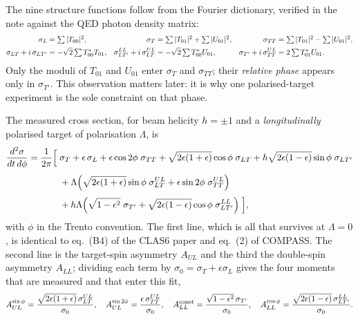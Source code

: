 \documentclass[11pt,a4paper]{article}
\newcommand{\sig}[1]{\sigma_{#1}}
\begin{document}
The nine structure functions follow from the Fourier dictionary, verified in
the note against the QED photon density matrix:
\begin{align}
\sig{L} &= \textstyle\sum |T_{00}|^2, &
\sig{T} &= \textstyle\sum |T_{01}|^2 + \sum |U_{01}|^2, &
\sig{TT} &= \textstyle\sum |T_{01}|^2 - \sum |U_{01}|^2,\notag\\
\sig{LT} + i\,\sig{LT'} &= -\sqrt2 \textstyle\sum T_{00}^{*} T_{01}, &
\sig{LT'}^{LL} + i\,\sig{LT}^{UL} &= -\sqrt2 \textstyle\sum T_{00}^{*} U_{01}, &
\sig{T'} + i\,\sig{TT}^{UL} &= 2 \textstyle\sum T_{01}^{*} U_{01}.
\label{eq:gram}
\end{align}
Only the moduli of $T_{01}$ and $U_{01}$ enter $\sig{T}$ and $\sig{TT}$; their
\emph{relative phase} appears only in $\sig{T'}$.  This observation matters
later: it is why one polarised-target experiment is the sole constraint on that
phase.

The measured cross section, for beam helicity $h = \pm 1$ and a
\emph{longitudinally} polarised target of polarisation $\Lambda$, is
\begin{align}
\frac{d^2\sigma}{dt\,d\phi} = \frac{1}{2\pi}\Big[\;
& \sig{T} + \epsilon\,\sig{L}
+ \epsilon\cos 2\phi\; \sig{TT}
+ \sqrt{2\epsilon(1+\epsilon)}\cos\phi\; \sig{LT}
+ h\sqrt{2\epsilon(1-\epsilon)}\sin\phi\; \sig{LT'}
\notag\\[1mm]
& + \Lambda\Big(\sqrt{2\epsilon(1+\epsilon)}\sin\phi\; \sig{LT}^{UL}
              + \epsilon\sin 2\phi\; \sig{TT}^{UL}\Big)
\notag\\[1mm]
& + h\Lambda\Big(\sqrt{1-\epsilon^2}\; \sig{T'}
               + \sqrt{2\epsilon(1-\epsilon)}\cos\phi\; \sig{LT'}^{LL}\Big)
\;\Big],
\label{eq:phidecomp}
\end{align}
with $\phi$ in the Trento convention.  The first line, which is all that
survives at $\Lambda = 0$, is identical to eq.~(B4) of the CLAS6 paper and
eq.~(2) of COMPASS.  The second line is the target-spin asymmetry $A_{UL}$ and
the third the double-spin asymmetry $A_{LL}$; dividing each term by
$\sigma_0 = \sig{T} + \epsilon\sig{L}$ gives the four moments that are measured
and that enter this fit,
\begin{equation}
A_{UL}^{\sin\phi} = \frac{\sqrt{2\epsilon(1+\epsilon)}\,\sig{LT}^{UL}}{\sigma_0},
\quad
A_{UL}^{\sin 2\phi} = \frac{\epsilon\,\sig{TT}^{UL}}{\sigma_0},
\quad
A_{LL}^{\rm const} = \frac{\sqrt{1-\epsilon^2}\,\sig{T'}}{\sigma_0},
\quad
A_{LL}^{\cos\phi} = \frac{\sqrt{2\epsilon(1-\epsilon)}\,\sig{LT'}^{LL}}{\sigma_0}.
\label{eq:polmoments}
\end{equation}
\end{document}
